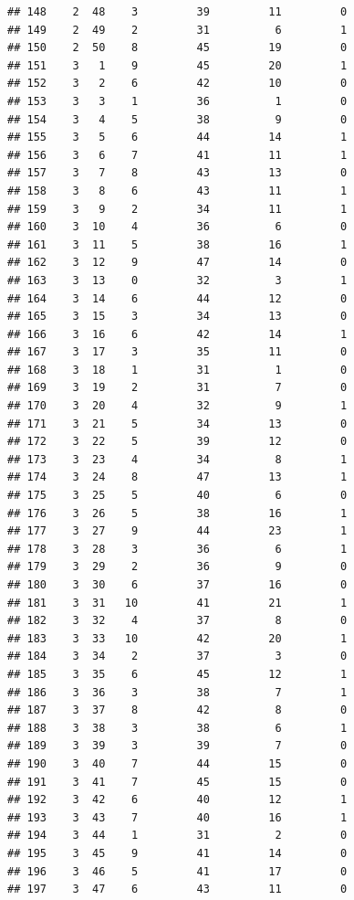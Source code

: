 \documentclass[]{book}
\begin{document}
\begin{verbatim}
## 148    2  48    3         39         11         0
## 149    2  49    2         31          6         1
## 150    2  50    8         45         19         0
## 151    3   1    9         45         20         1
## 152    3   2    6         42         10         0
## 153    3   3    1         36          1         0
## 154    3   4    5         38          9         0
## 155    3   5    6         44         14         1
## 156    3   6    7         41         11         1
## 157    3   7    8         43         13         0
## 158    3   8    6         43         11         1
## 159    3   9    2         34         11         1
## 160    3  10    4         36          6         0
## 161    3  11    5         38         16         1
## 162    3  12    9         47         14         0
## 163    3  13    0         32          3         1
## 164    3  14    6         44         12         0
## 165    3  15    3         34         13         0
## 166    3  16    6         42         14         1
## 167    3  17    3         35         11         0
## 168    3  18    1         31          1         0
## 169    3  19    2         31          7         0
## 170    3  20    4         32          9         1
## 171    3  21    5         34         13         0
## 172    3  22    5         39         12         0
## 173    3  23    4         34          8         1
## 174    3  24    8         47         13         1
## 175    3  25    5         40          6         0
## 176    3  26    5         38         16         1
## 177    3  27    9         44         23         1
## 178    3  28    3         36          6         1
## 179    3  29    2         36          9         0
## 180    3  30    6         37         16         0
## 181    3  31   10         41         21         1
## 182    3  32    4         37          8         0
## 183    3  33   10         42         20         1
## 184    3  34    2         37          3         0
## 185    3  35    6         45         12         1
## 186    3  36    3         38          7         1
## 187    3  37    8         42          8         0
## 188    3  38    3         38          6         1
## 189    3  39    3         39          7         0
## 190    3  40    7         44         15         0
## 191    3  41    7         45         15         0
## 192    3  42    6         40         12         1
## 193    3  43    7         40         16         1
## 194    3  44    1         31          2         0
## 195    3  45    9         41         14         0
## 196    3  46    5         41         17         0
## 197    3  47    6         43         11         0

\end{verbatim}
\end{document}
